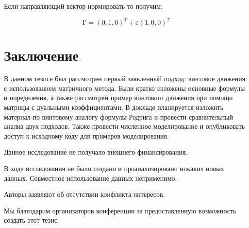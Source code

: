 \documentclass[%
]{ittmm}
\begin{document}
Если направляющий вектор нормировать то получим:

\begin{equation*}
  \mathbf{l}' = (0,1,0)^T + \varepsilon (1,0,0)^T
\end{equation*}


\section{Заключение}
В данном тезисе был рассмотрен первый заявленный подход: винтовое движения с использованием матричного метода. 
Были кратко изложены основные формулы и определения, а также рассмотрен пример винтового движения при помощи матрицы с дуальными коэффициентами. 
В докладе планируется изложить материал по винтовому аналогу формулы Родрига и провести сравнительный анализ двух подходов. Также провести численное моделирование и опубликовать доступ к исходному коду для примеров моделирования. 


\vspace{\baselineskip}


\begin{funding}
  Данное исследование не получало внешнего финансирования.
\end{funding}

\begin{dataavailability}
  В ходе исследования не было создано и проанализировано никаких новых данных. Совместное использование данных неприменимо.
\end{dataavailability}

\begin{conflictsofinterest}
  Авторы заявляют об отсутствии конфликта интересов.
\end{conflictsofinterest}

\begin{acknowledgments}
  Мы благодарим организаторов конференции за предоставленную возможность создать этот тезис.
\end{acknowledgments}

\printbibliography
\end{document}
